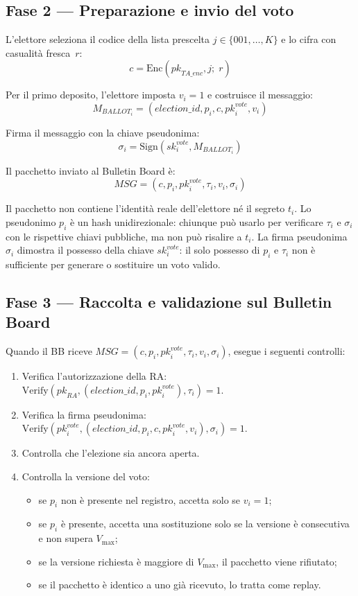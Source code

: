 \documentclass[12pt,a4paper]{article}
\newcommand{\pk}{\mathit{pk}}
\newcommand{\sk}{\mathit{sk}}
\begin{document}
\subsection{Fase 2 --- Preparazione e invio del voto}

L'elettore seleziona il codice della lista prescelta $j \in \{001, \ldots, K\}$ e lo cifra con casualit\`a fresca~$r$:
\[
c = \mathrm{Enc}(\pk_{\mathit{TA\_enc}}, j;\; r)
\]

Per il primo deposito, l'elettore imposta $v_i = 1$ e costruisce il messaggio:
\[
M_{\mathit{BALLOT}_i} = (\mathit{election\_id}, p_i, c, \pk_i^{\mathit{vote}}, v_i)
\]

Firma il messaggio con la chiave pseudonima:
\[
\sigma_i = \mathrm{Sign}(\sk_i^{\mathit{vote}}, M_{\mathit{BALLOT}_i})
\]

Il pacchetto inviato al Bulletin Board \`e:
\[
\mathit{MSG} = (c, p_i, \pk_i^{\mathit{vote}}, \tau_i, v_i, \sigma_i)
\]

Il pacchetto non contiene l'identit\`a reale dell'elettore n\'e il segreto $t_i$. Lo pseudonimo $p_i$ \`e un hash unidirezionale: chiunque pu\`o usarlo per verificare $\tau_i$ e $\sigma_i$ con le rispettive chiavi pubbliche, ma non pu\`o risalire a $t_i$. La firma pseudonima $\sigma_i$ dimostra il possesso della chiave $\sk_i^{\mathit{vote}}$: il solo possesso di $p_i$ e $\tau_i$ non \`e sufficiente per generare o sostituire un voto valido.

\subsection{Fase 3 --- Raccolta e validazione sul Bulletin Board}

Quando il BB riceve $\mathit{MSG} = (c, p_i, \pk_i^{\mathit{vote}}, \tau_i, v_i, \sigma_i)$, esegue i seguenti controlli:

\begin{enumerate}
\item Verifica l'autorizzazione della RA: $\mathrm{Verify}(\pk_{\mathit{RA}}, (\mathit{election\_id}, p_i, \pk_i^{\mathit{vote}}), \tau_i) = 1$.
\item Verifica la firma pseudonima: $\mathrm{Verify}(\pk_i^{\mathit{vote}}, (\mathit{election\_id}, p_i, c, \pk_i^{\mathit{vote}}, v_i), \sigma_i) = 1$.
\item Controlla che l'elezione sia ancora aperta.
\item Controlla la versione del voto:
    \begin{itemize}
    \item se $p_i$ non \`e presente nel registro, accetta solo se $v_i = 1$;
    \item se $p_i$ \`e presente, accetta una sostituzione solo se la versione \`e consecutiva e non supera $V_{\max}$;
    \item se la versione richiesta \`e maggiore di $V_{\max}$, il pacchetto viene rifiutato;
    \item se il pacchetto \`e identico a uno gi\`a ricevuto, lo tratta come replay.
    \end{itemize}
\end{enumerate}
\end{document}

